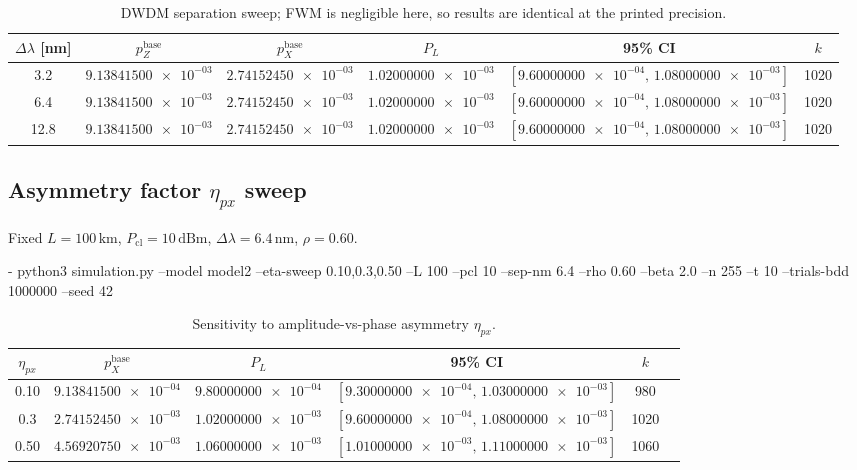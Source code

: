 \documentclass[conference]{IEEEtran}
\newcommand{\nexact}[1]{\num[round-mode=off]{#1}}
\newcommand{\simL}{100}
\newcommand{\simpcl}{10}
\newcommand{\simsep}{6.4}
\newcommand{\simeta}{0.3}
\newcommand{\simn}{255}
\newcommand{\simt}{10}
\newcommand{\simtrials}{1000000}
\newcommand{\simseed}{42}
\newcommand{\simpz}{9.13841500e-03}
\newcommand{\simpx}{2.74152450e-03}
\newcommand{\simrhoB}{0.60}
\newcommand{\simpLB}{1.02000000e-03}
\newcommand{\simpLBlo}{9.60000000e-04}
\newcommand{\simpLBhi}{1.08000000e-03}
\newcommand{\simkB}{1020}
\newcommand{\simsepA}{3.2}
\newcommand{\simpzSepA}{9.13841500e-03}
\newcommand{\simpxSepA}{2.74152450e-03}
\newcommand{\simpLSepA}{1.02000000e-03}
\newcommand{\simpLSepAlo}{9.60000000e-04}
\newcommand{\simpLSepAhi}{1.08000000e-03}
\newcommand{\simkSepA}{1020}
\newcommand{\simsepB}{12.8}
\newcommand{\simpzSepB}{9.13841500e-03}
\newcommand{\simpxSepB}{2.74152450e-03}
\newcommand{\simpLSepB}{1.02000000e-03}
\newcommand{\simpLSepBlo}{9.60000000e-04}
\newcommand{\simpLSepBhi}{1.08000000e-03}
\newcommand{\simkSepB}{1020}
\newcommand{\simetaA}{0.10}
\newcommand{\simpxEtaA}{9.13841500e-04}
\newcommand{\simpLEtaA}{9.80000000e-04}
\newcommand{\simpLEtaAlo}{9.30000000e-04}
\newcommand{\simpLEtaAhi}{1.03000000e-03}
\newcommand{\simkEtaA}{980}
\newcommand{\simetaB}{0.50}
\newcommand{\simpxEtaB}{4.56920750e-03}
\newcommand{\simpLEtaB}{1.06000000e-03}
\newcommand{\simpLEtaBlo}{1.01000000e-03}
\newcommand{\simpLEtaBhi}{1.11000000e-03}
\newcommand{\simkEtaB}{1060}
\begin{document}
\begin{table}[t!]
\small
\centering
\caption{DWDM separation sweep; FWM is negligible here, so results are identical at the printed precision.}
\label{tab:sep}
\begin{adjustbox}{width=\linewidth}
\begin{tabular}{cccccc}
\toprule
\(\Delta\lambda\) [nm] & \(p_Z^{\text{base}}\) & \(p_X^{\text{base}}\) & \(P_L\) & 95\% CI & \(k\) \\
\midrule
\simsepA & \(\nexact{\simpzSepA}\) & \(\nexact{\simpxSepA}\) & \(\nexact{\simpLSepA}\) & \([\nexact{\simpLSepAlo},\,\nexact{\simpLSepAhi}]\) & \simkSepA \\
\simsep & \(\nexact{\simpz}\) & \(\nexact{\simpx}\) & \(\nexact{\simpLB}\) & \([\nexact{\simpLBlo},\,\nexact{\simpLBhi}]\) & \simkB \\
\simsepB & \(\nexact{\simpzSepB}\) & \(\nexact{\simpxSepB}\) & \(\nexact{\simpLSepB}\) & \([\nexact{\simpLSepBlo},\,\nexact{\simpLSepBhi}]\) & \simkSepB \\
\bottomrule
\end{tabular}
\end{adjustbox}
\end{table}

\subsection{Asymmetry factor \(\eta_{px}\) sweep}
Fixed \(L=\simL\,\mathrm{km}\), \(P_{\mathrm{cl}}=\simpcl\,\mathrm{dBm}\), \(\Delta\lambda=\simsep\,\mathrm{nm}\), \(\rho=\simrhoB\).

- python3 simulation.py --model model2 --eta-sweep \simetaA{},\simeta{},\simetaB{} --L \simL{} --pcl \simpcl{} --sep-nm \simsep{} --rho \simrhoB{} --beta 2.0 --n \simn{} --t \simt{} --trials-bdd \simtrials{} --seed \simseed

\begin{table}[t!]
\small
\centering
\caption{Sensitivity to amplitude-vs-phase asymmetry \(\eta_{px}\).}
\label{tab:eta}
\begin{adjustbox}{width=\linewidth}
\begin{tabular}{cccccc}
\toprule
\(\eta_{px}\) & \(p_X^{\text{base}}\) & \(P_L\) & 95\% CI & \(k\) \\
\midrule
\simetaA & \(\nexact{\simpxEtaA}\) & \(\nexact{\simpLEtaA}\) & \([\nexact{\simpLEtaAlo},\,\nexact{\simpLEtaAhi}]\) & \simkEtaA \\
\simeta & \(\nexact{\simpx}\) & \(\nexact{\simpLB}\) & \([\nexact{\simpLBlo},\,\nexact{\simpLBhi}]\) & \simkB \\
\simetaB & \(\nexact{\simpxEtaB}\) & \(\nexact{\simpLEtaB}\) & \([\nexact{\simpLEtaBlo},\,\nexact{\simpLEtaBhi}]\) & \simkEtaB \\
\bottomrule
\end{tabular}
\end{adjustbox}
\end{table}
\end{document}
